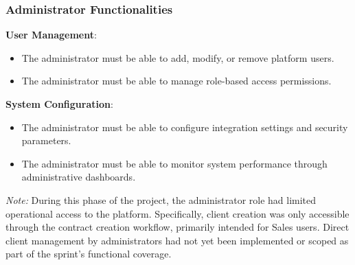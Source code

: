 \subsubsection{Administrator Functionalities}

\textbf{User Management}:\vspace{0.4em}
\begin{adjustwidth}{3em}{1em}
    \begin{itemize}
        \item The administrator must be able to add, modify, or remove platform users.\vspace{0.4em}
        \item The administrator must be able to manage role-based access permissions.
    \end{itemize}
\end{adjustwidth}\vspace{0.85em} 

\textbf{System Configuration}:\vspace{0.4em}
\begin{adjustwidth}{3em}{1em}
    \begin{itemize}
        \item The administrator must be able to configure integration settings and security parameters.\vspace{0.4em}
        \item The administrator must be able to monitor system performance through administrative dashboards.
    \end{itemize}
\end{adjustwidth}\vspace{0.85em} 

\noindent\textit{Note:} During this phase of the project, the administrator role had limited operational access to the platform. Specifically, client creation was only accessible through the contract creation workflow, primarily intended for Sales users. Direct client management by administrators had not yet been implemented or scoped as part of the sprint’s functional coverage.

